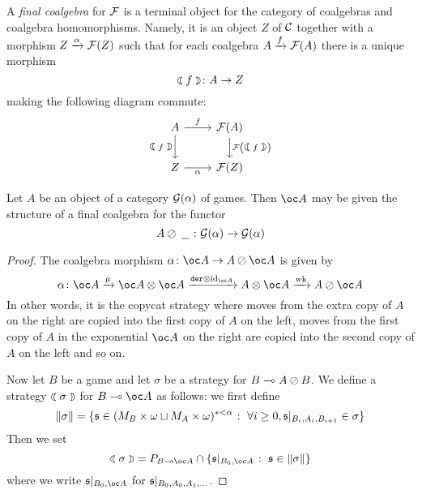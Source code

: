 \documentclass[11pt]{article} %
\begin{document}
A \emph{final coalgebra} for $\F$ is a terminal object for the category of coalgebras and coalgebra homomorphisms.  Namely, it is an object $Z$ of $\C$ together with a morphism $\map{\alpha}{Z}{\F(Z)}$ such that for each coalgebra $\map{f}{A}{\F(A)}$ there is a unique morphism
\[
  \fcoal{f}\from A \to Z
  \]
making the following diagram commute:
\[
  \begin{tikzcd}
    A \arrow[r, "f"] \arrow[d, "\fcoal{f}"']
      & \F(A) \arrow[d, "\F\left(\fcoal{f}\right)"] \\
    Z \arrow[r, "\alpha"']
      & \F(Z)
  \end{tikzcd}
  \]

\begin{theorem}
  Let $A$ be an object of a category $\G(\alpha)$ of games.  Then $\oc A$ may be given the structure of a final coalgebra for the functor
  \[
    A\sequoid\blank\from \G(\alpha)\to\G(\alpha)
    \]
  \begin{proof}
    The coalgebra morphism $\alpha\from \oc A\to A\sequoid\oc A$ is given by
    \[
      \alpha \from \oc A \xrightarrow{\mu} \oc A \tensor \oc A \xrightarrow{\der\tensor\id_{\oc A}} A\tensor\oc A\xrightarrow{\wk} A\sequoid\oc A
      \]
    In other words, it is the copycat strategy where moves from the extra copy of $A$ on the right are copied into the first copy of $A$ on the left, moves from the first copy of $A$ in the exponential $\oc A$ on the right are copied into the second copy of $A$ on the left and so on.  

    Now let $B$ be a game and let $\sigma$ be a strategy for $B\implies A\sequoid B$.  We define a strategy $\fcoal{\sigma}$ for $B\implies \oc A$ as follows: we first define
    \[
      \|\sigma\| = \{\s\in(M_B\times\omega\cprd M_A\times\omega)^{*<\alpha}\suchthat\forall i\ge 0, \s\vert_{B_i,A_i,B_{i+1}}\in\sigma\}
      \]
    Then we set
    \[
      \fcoal\sigma = P_{B\implies\oc A} \cap \{\s\vert_{B_0,\oc A}\suchthat\s\in\|\sigma\|\}
      \]
    where we write $\s\vert_{B_0, \oc A}$ for $\s\vert_{B_0,A_0,A_1,\dots}$.  


\end{proof}
\end{theorem}
\end{document}
